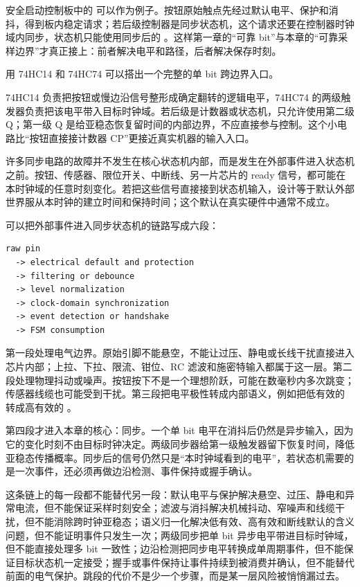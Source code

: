 安全启动控制板中的  可以作为例子。按钮原始触点先经过默认电平、保护和消抖，得到板内稳定请求；若后级控制器是同步状态机，这个请求还要在控制器时钟域内同步，状态机只能使用同步后的 。这样第一章的“可靠 bit”与本章的“可靠采样边界”才真正接上：前者解决电平和路径，后者解决保存时刻。

\begin{chipcase}
用 74HC14 和 74HC74 可以搭出一个完整的单 bit 跨边界入口。

74HC14 负责把按钮或慢边沿信号整形成确定翻转的逻辑电平，74HC74 的两级触发器负责把该电平带入目标时钟域。若后级是计数器或状态机，只允许使用第二级 Q；第一级 Q 是给亚稳态恢复留时间的内部边界，不应直接参与控制。这个小电路比“按钮直接接计数器 CP”更接近真实机器的输入入口。
\end{chipcase}


许多同步电路的故障并不发生在核心状态机内部，而是发生在外部事件进入状态机之前。按钮、传感器、限位开关、中断线、另一片芯片的 ready 信号，都可能在本时钟域的任意时刻变化。若把这些信号直接接到状态机输入，设计等于默认外部世界服从本时钟的建立时间和保持时间；这个默认在真实硬件中通常不成立。

可以把外部事件进入同步状态机的链路写成六段：

\begin{lstlisting}
raw pin
  -> electrical default and protection
  -> filtering or debounce
  -> level normalization
  -> clock-domain synchronization
  -> event detection or handshake
  -> FSM consumption
\end{lstlisting}

第一段处理电气边界。原始引脚不能悬空，不能让过压、静电或长线干扰直接进入芯片内部；上拉、下拉、限流、钳位、RC 滤波和施密特输入都属于这一层。第二段处理物理抖动或噪声。按钮按下不是一个理想阶跃，可能在数毫秒内多次跳变；传感器线缆也可能受到干扰。第三段把电平极性转成内部语义，例如把低有效的  转成高有效的 。

第四段才进入本章的核心：同步。一个单 bit 电平在消抖后仍然是异步输入，因为它的变化时刻不由目标时钟决定。两级同步器给第一级触发器留下恢复时间，降低亚稳态传播概率。同步后的信号仍然只是“本时钟域看到的电平”，若状态机需要的是一次事件，还必须再做边沿检测、事件保持或握手确认。

这条链上的每一段都不能替代另一段：默认电平与保护解决悬空、过压、静电和异常电流，但不能保证采样时刻安全；滤波与消抖解决机械抖动、窄噪声和线缆干扰，但不能消除跨时钟亚稳态；语义归一化解决低有效、高有效和断线默认的含义问题，但不能证明事件只发生一次；两级同步把单 bit 异步电平带进目标时钟域，但不能直接处理多 bit 一致性；边沿检测把同步电平转换成单周期事件，但不能保证目标状态机一定接受；握手或事件保持让事件持续到被消费并确认，但不能替代前面的电气保护。跳段的代价不是少一个步骤，而是某一层风险被悄悄漏过去。

